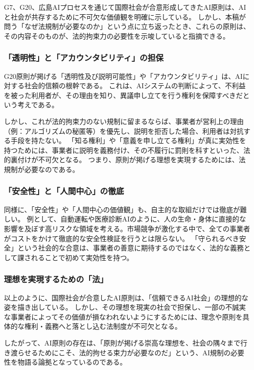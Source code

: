G7、G20、広島AIプロセスを通じて国際社会が合意形成してきたAI原則は、AIと社会が共存するために不可欠な価値観を明確に示している。
しかし、本稿が問う「なぜ法規制が必要なのか」という点に立ち返ったとき、これらの原則は、その内容そのものが、法的拘束力の必要性を示唆していると指摘できる。

\subsubsection{「透明性」と「アカウンタビリティ」の担保}

G20原則が掲げる「透明性及び説明可能性」や「アカウンタビリティ」は、AIに対する社会的信頼の根幹である。
これは、AIシステムの判断によって、不利益を被った利用者が、その理由を知り、異議申し立てを行う権利を保障すべきだという考えである。

しかし、これが法的拘束力のない規制に留まるならば、事業者が営利上の理由（例：アルゴリズムの秘匿等）を優先し、説明を拒否した場合、利用者は対抗する手段を持たない。
「知る権利」や「意義を申し立てる権利」が真に実効性を持つためには、事業者に説明を義務付け、その不履行に罰則を科すといった、法的裏付けが不可欠となる。
つまり、原則が掲げる理想を実現するためには、法規制が必要なのである。

\subsubsection{「安全性」と「人間中心」の徹底}

同様に、「安全性」や「人間中心の価値観」も、自主的な取組だけでは徹底が難しい。
例として、自動運転や医療診断AIのように、人の生命・身体に直接的な影響を及ぼす高リスクな領域を考える。市場競争が激化する中で、全ての事業者がコストをかけて徹底的な安全性検証を行うとは限らない。
「守られるべき安全」という社会的な合意は、事業者の善意に期待するのではなく、法的な義務として課されることで初めて実効性を持つ。

\subsubsection{理想を実現するための「法」}

以上のように、国際社会が合意したAI原則は、「信頼できるAI社会」の理想的な姿を描き出している。
しかし、その理想を現実の社会で担保し、一部の不誠実な事業者によってその価値が損なわれないようにするためには、理念や原則を具体的な権利・義務へと落とし込む法制度が不可欠となる。

したがって、AI原則の存在は、「原則が掲げる崇高な理想を、社会の隅々まで行き渡らせるためにこそ、法的拘せる束力が必要なのだ」という、AI規制の必要性を物語る論拠となっているのである。


